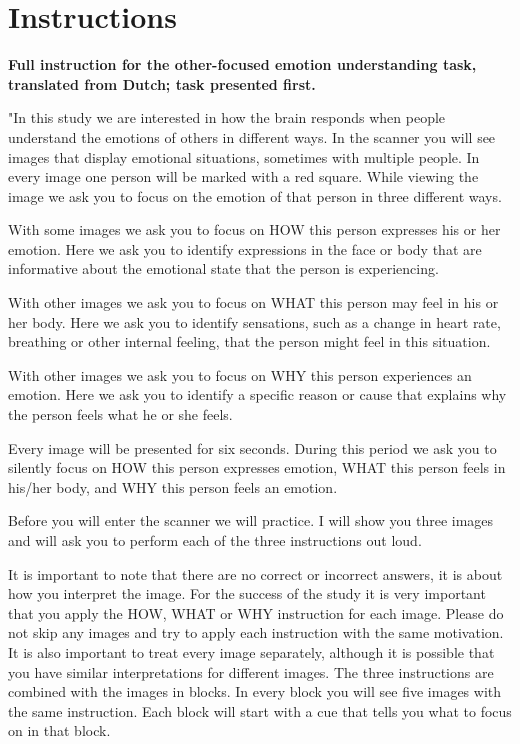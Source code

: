 \documentclass[11pt,american,]{memoir} %
\begin{document}
\hypertarget{instructions}{%
\section{Instructions}\label{instructions}}

\textbf{Full instruction for the other-focused emotion understanding task, translated from Dutch; task presented first.}

"In this study we are interested in how the brain responds when people understand the emotions of others in different ways. In the scanner you will see images that display emotional situations, sometimes with multiple people. In every image one person will be marked with a red square. While viewing the image we ask you to focus on the emotion of that person in three different ways.

With some images we ask you to focus on HOW this person expresses his or her emotion. Here we ask you to identify expressions in the face or body that are informative about the emotional state that the person is experiencing.

With other images we ask you to focus on WHAT this person may feel in his or her body. Here we ask you to identify sensations, such as a change in heart rate, breathing or other internal feeling, that the person might feel in this situation.

With other images we ask you to focus on WHY this person experiences an emotion. Here we ask you to identify a specific reason or cause that explains why the person feels what he or she feels.

Every image will be presented for six seconds. During this period we ask you to silently focus on HOW this person expresses emotion, WHAT this person feels in his/her body, and WHY this person feels an emotion.

Before you will enter the scanner we will practice. I will show you three images and will ask you to perform each of the three instructions out loud.

It is important to note that there are no correct or incorrect answers, it is about how you interpret the image. For the success of the study it is very important that you apply the HOW, WHAT or WHY instruction for each image. Please do not skip any images and try to apply each instruction with the same motivation. It is also important to treat every image separately, although it is possible that you have similar interpretations for different images.
The three instructions are combined with the images in blocks. In every block you will see five images with the same instruction. Each block will start with a cue that tells you what to focus on in that block.
\end{document}

